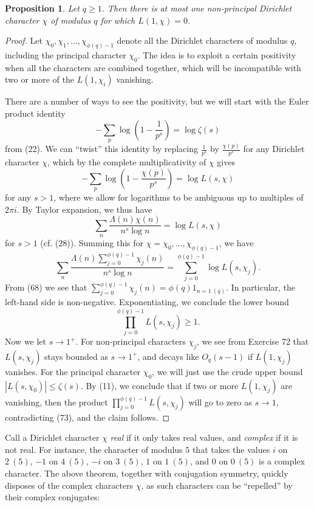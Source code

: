 \documentclass[10pt,reqno]{amsart}
\newtheorem{prop}[theorem]{Proposition}
\begin{document}
\begin{prop}
    Let $q \geq 1$. Then there is at most one non-principal Dirichlet character $\chi$ of modulus $q$ for which $L(1,\chi) = 0$.
\end{prop}
\begin{proof}
    Let $\chi_0, \chi_1,\dots,\chi_{\phi(q)-1}$ denote all the Dirichlet characters of modulus $q$, including the principal character $\chi_0$. The idea is to exploit a certain positivity when all the characters are combined together, which will be incompatible with two or more of the $L(1,\chi_i)$ vanishing.

    There are a number of ways to see the positivity, but we will start with the Euler product identity
    \[  - \sum_p \log \left( 1 - \frac{1}{p^s} \right) = \log \zeta(s) \]
    from (22). We can “twist” this identity by replacing $\frac{1}{p^s}$ by $\frac{\chi(p)}{p^s}$ for any Dirichlet character $\chi$, which by the complete multiplicativity of $\chi$ gives
    \[  - \sum_p \log( 1 - \frac{\chi(p)}{p^s} ) = \log L(s,\chi) \]
    for any $s>1$, where we allow for logarithms to be ambiguous up to multiples of $2\pi i$. By Taylor expansion, we thus have
    \[  \sum_n \frac{\Lambda(n) \chi(n)}{n^s \log n} = \log L(s,\chi) \]
    for $s>1$ (cf. (28)). Summing this for $\chi = \chi_0,\dots,\chi_{\phi(q)-1}$, we have
    \[  \sum_n \frac{\Lambda(n) \sum_{j=0}^{\phi(q)-1} \chi_j(n)}{n^s \log n} = \sum_{j=0}^{\phi(q)-1} \log L(s,\chi_j). \]
    From (68) we see that $\sum_{j=0}^{\phi(q)-1} \chi_j(n) = \phi(q) 1_{n = 1\ (q)}$. In particular, the left-hand side is non-negative. Exponentiating, we conclude the lower bound
    \begin{equation}   \prod_{j=0}^{\phi(q)-1} L(s,\chi_j) \geq 1. \end{equation}
    Now we let $s \rightarrow 1^+$. For non-principal characters $\chi_j$, we see from Exercise 72 that $L(s,\chi_j)$ stays bounded as $s \rightarrow 1^+$, and decays like $O_q(s-1)$ if $L(1,\chi_j)$ vanishes. For the principal character $\chi_0$, we will just use the crude upper bound $|L(s,\chi_0)| \leq \zeta(s)$. By (11), we conclude that if two or more $L(1,\chi_j)$ are vanishing, then the product $\prod_{j=0}^{\phi(q)-1} L(s,\chi_j)$ will go to zero as $s \rightarrow 1$, contradicting (73), and the claim follows. %
\end{proof}

Call a Dirichlet character $\chi$ \emph{real} if it only takes real values, and \emph{complex} if it is not real. For instance, the character of modulus $5$ that takes the values $i$ on $2\ (5)$, $-1$ on $4\ (5)$, $-i$ on $3\ (5)$, $1$ on $1\ (5)$, and $0$ on $0\ (5)$ is a complex character. The above theorem, together with conjugation symmetry, quickly disposes of the complex characters $\chi$, as such characters can be “repelled” by their complex conjugates:
\end{document}
